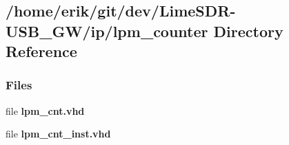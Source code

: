 \subsection{/home/erik/git/dev/\+Lime\+S\+D\+R-\/\+U\+S\+B\+\_\+\+G\+W/ip/lpm\+\_\+counter Directory Reference}
\label{dir_473f51df7e9271d1dcd4da3a338c4f9e}
\subsubsection*{Files}
\begin{DoxyCompactItemize}
\item 
file {\bf lpm\+\_\+cnt.\+vhd}
\item 
file {\bf lpm\+\_\+cnt\+\_\+inst.\+vhd}
\end{DoxyCompactItemize}
